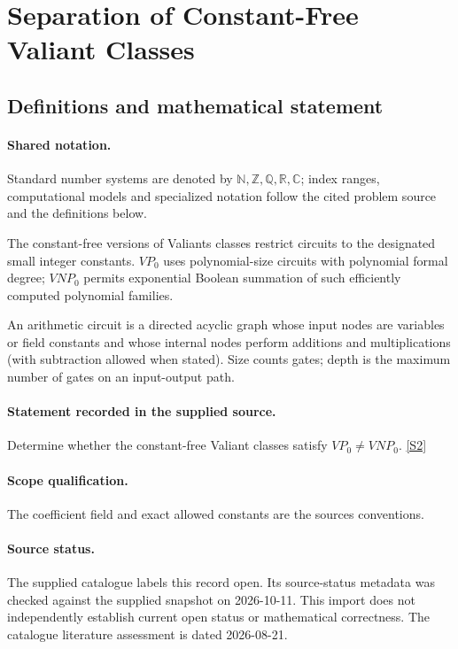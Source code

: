 \documentclass[11pt]{article}
\newcommand{\sref}[2]{\hyperlink{source:#1:#2}{[S#2]}}
\begin{document}
\section{Separation of Constant-Free Valiant Classes}\label{statement}

\subsection{Definitions and mathematical statement}

\paragraph{Shared notation.}Standard number systems are denoted by $\mathbb N,\mathbb Z,\mathbb Q,\mathbb R,\mathbb C$; index ranges, computational models and specialized notation follow the cited problem source and the definitions below.


The constant-free versions of Valiant\textquotesingle s classes restrict circuits to the designated small integer constants. $VP_0$ uses polynomial-size circuits with polynomial formal degree; $VNP_0$ permits exponential Boolean summation of such efficiently computed polynomial families.

An arithmetic circuit is a directed acyclic graph whose input nodes are variables or field constants and whose internal nodes perform additions and multiplications (with subtraction allowed when stated). Size counts gates; depth is the maximum number of gates on an input-output path.
\paragraph{Statement recorded in the supplied source.}
Determine whether the constant-free Valiant classes satisfy $VP_0\neq VNP_0$. \sref{statement}{2}
\paragraph{Scope qualification.}
The coefficient field and exact allowed constants are the source\textquotesingle s conventions.
\paragraph{Source status.}
The supplied catalogue labels this record open. Its source-status metadata was checked against the supplied snapshot on 2026-10-11. This import does not independently establish current open status or mathematical correctness. The catalogue literature assessment is dated 2026-08-21.
\end{document}
